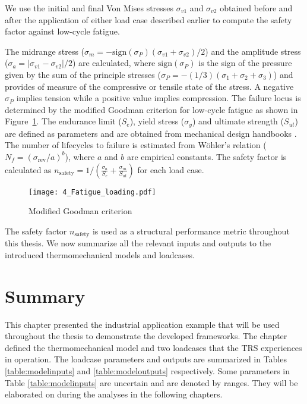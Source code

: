 We use the initial and final Von Mises stresses $\sigma_{v1}$ and $\sigma_{v2}$ obtained before and after the application of either load case described earlier to compute the safety factor against low-cycle fatigue.

The midrange stress ($\sigma_m = -\textrm{sign}(\sigma_P)\left( \sigma_{v1} + \sigma_{v2}\right) / 2$) and the amplitude stress ($\sigma_a = \left| \sigma_{v1} - \sigma_{v2}\right| / 2$) are calculated, where $\textrm{sign}(\sigma_P)$ is the sign of the pressure given by the sum of the principle stresses ($\sigma_P = -(1/3) (\sigma_1 + \sigma_2 + \sigma_3)$) and provides of measure of the compressive or tensile state of the stress. A negative $\sigma_P$ implies tension while a positive value implies compression. The failure locus is determined by the modified Goodman criterion for low-cycle fatigue as shown in Figure~\ref{fig:GMcrit}. The endurance limit ($S_e$), yield stress ($\sigma_y$) and ultimate strength ($S_{ut}$) are defined as parameters and are obtained from mechanical design handbooks \cite{Budynas2015}. The number of lifecycles to failure is estimated from W{\"o}hler's relation ($N_f = \left(\sigma_{\textrm{rev}}/a\right)^b$), where $a$ and $b$ are empirical constants. The safety factor is calculated as $n_{\textrm{safety}} = 1/\left({\frac{\sigma_a}{S_e}+\frac{\sigma_m}{S_{ut}}}\right)$ for each load case. 

\begin{figure}[h!]
    \centering
    \texttt{[image: 4\_Fatigue\_loading.pdf]}
    \caption{ \label{fig:GMcrit} Modified Goodman criterion }
\end{figure}

The safety factor $n_{\textrm{safety}}$ is used as a structural performance metric throughout this thesis. We now summarize all the relevant inputs and outputs to the introduced thermomechanical models and loadcases.

\section{Summary}
\label{sec:thermosummary}

This chapter presented the industrial application example that will be used throughout the thesis to demonstrate the developed frameworks. The chapter defined the thermomechanical model and two loadcases that the \ac{TRS} experiences in operation. The loadcase parameters and outputs are summarized in Tables \ref{table:modelinputs} and \ref{table:modeloutputs} respectively. Some parameters in Table \ref{table:modelinputs} are uncertain and are denoted by ranges. They will be elaborated on during the analyses in the following chapters.

